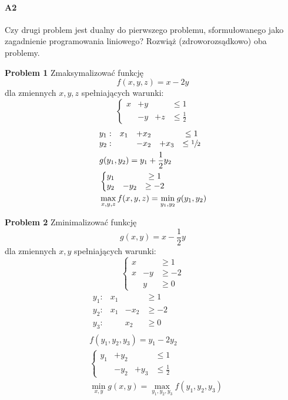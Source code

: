 \paragraph{A2} Czy drugi problem jest dualny do pierwszego problemu, sformułowanego jako zagadnienie programowania liniowego? Rozwiąż (zdroworozsądkowo) oba problemy.

\begin{minipage}{.5\textwidth}
\textbf{Problem 1} Zmaksymalizować funkcję
$$f(x, y, z) = x - 2y$$
dla zmiennych $x, y, z$ spełniających warunki:
$$\left\{\begin{matrix}
x &+ y &&\leq 1\\
&-y &+ z &\leq \frac{1}{2}
\end{matrix}\right.$$
\begin{align*}
&\begin{matrix}
y_1: & x_1 &+x_2& &\leq 1\\
y_2: & &-x_2&+x_3 &\leq \sfrac{1}{2}
\end{matrix}\\
&g(y_1,y_2)=y_1+\frac{1}{2}y_2\\
&\left\{\begin{matrix}
y_1&&\geq 1\\
y_2&-y_2&\geq -2
\end{matrix}\right.\\
&\max _{x,y,z}f(x,y,z)=\min _{y_1,y_2}g(y_1,y_2)
\end{align*}
\end{minipage}%
\begin{minipage}{.5\textwidth}
\textbf{Problem 2} Zminimalizować funkcję
$$g(x, y) = x - \frac{1}{2}y$$
dla zmiennych $x, y$ spełniających warunki:
$$\left\{\begin{matrix}
x &&\geq 1\\
x &- y &\geq -2\\
&y &\geq 0
\end{matrix}\right.$$
\begin{align*}
&\begin{matrix}
y_1: & x_1 & &\geq 1\\
y_2: & x_1 &-x_2 &\geq -2\\
y_3: & & x_2 &\geq 0
\end{matrix}\\
&f(y_1,y_2,y_3)=y_1-2y_2\\
&\left\{\begin{matrix}
y_1	&+y_2	&		&\leq 1\\
	&-y_2	&+y_3	&\leq \frac{1}{2}
\end{matrix}\right.\\
&\min _{x,y}g(x,y)=\max _{y_1,y_2,y_3}f(y_1,y_2,y_3)
\end{align*}
\end{minipage}




